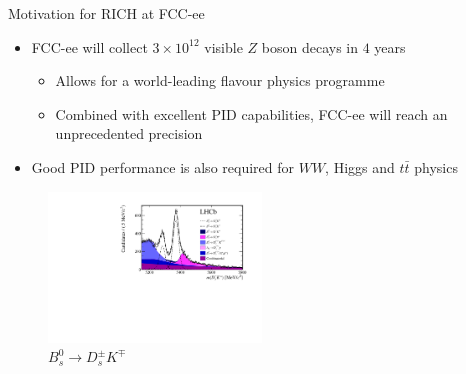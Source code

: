 \documentclass{beamer}
\begin{document}
\begin{frame}{Motivation for RICH at FCC-ee}
  \begin{itemize}
    \setlength\itemsep{1.0em}
    \item{FCC-ee will collect $3\times 10^{12}$ visible $Z$ boson decays in $4$ years}
    \begin{itemize}
      \item{Allows for a world-leading flavour physics programme}
      \item{Combined with excellent PID capabilities, FCC-ee will reach an unprecedented precision}
    \end{itemize}
    \item{Good PID performance is also required for $WW$, Higgs and $t\bar{t}$ physics}
  \end{itemize}
  \begin{figure}
    \centering
    \vspace{-0.2cm}
    \includegraphics[height = 4cm]{Plots/LHCb_BsDsK.pdf}
    \caption{$B_s^0\to D_s^\pm K^\mp$}
  \end{figure}
\end{frame}
\end{document}
